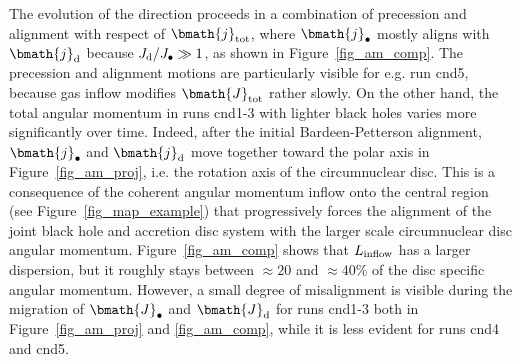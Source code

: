 \documentclass[a4paper,fleqn,usenatbib]{mnras}
\begin{document}
The evolution of the direction proceeds in a combination of precession and alignment with respect of $\bmath{j}_{\rm tot}$, where $\bmath{j}_{\bullet}$ mostly aligns with $\bmath{j}_{\rm d}$ because $J_{\rm d}/J_{\bullet} \gg 1$, as shown in Figure~\ref{fig_am_comp}.
The precession and alignment motions are particularly visible for e.g. run cnd5, because gas inflow modifies $\bmath{J}_{\rm tot}$ rather slowly.
On the other hand, the total angular momentum in runs cnd1-3 with lighter black holes varies more significantly over time.
Indeed, after the initial Bardeen-Petterson alignment, $\bmath{j}_{\bullet}$ and $\bmath{j}_{\rm d}$ move together toward the polar axis in Figure~\ref{fig_am_proj}, i.e. the rotation axis of the circumnuclear disc.
This is a consequence of the coherent angular momentum inflow onto the central region (see Figure~\ref{fig_map_example}) that progressively forces the alignment of the joint black hole and accretion disc system with the larger scale circumnuclear disc angular momentum.
Figure~\ref{fig_am_comp} shows that $L_{\rm inflow}$ has a larger dispersion, but it roughly stays between $\approx 20$ and $\approx 40 \%$ of the disc specific angular momentum.
However, a small degree of misalignment is visible during the migration of $\bmath{J}_{\bullet}$ and $\bmath{J}_{\rm d}$ for runs cnd1-3 both in Figure~\ref{fig_am_proj} and \ref{fig_am_comp}, while it is less evident for runs cnd4 and cnd5.
\end{document}
